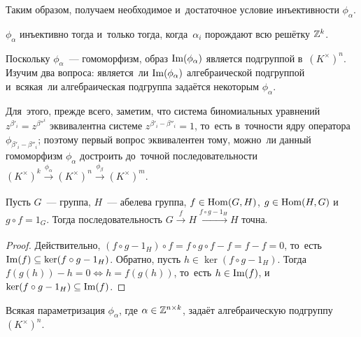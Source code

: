\documentclass{article}
\begin{document}
Таким образом, получаем необходимое и~достаточное условие инъективности $\phi_\alpha$.

\begin{theorem*}
    $\phi_\alpha$ инъективно тогда и~только тогда, когда~$\alpha_i$ порождают всю решётку $\mathbb{Z}^k$.
\end{theorem*}

Поскольку $\phi_\alpha$~— гомоморфизм, образ $\mathrm{Im}(\phi_\alpha)$ является подгруппой в~$(K^\times)^n$.
Изучим два вопроса: является~ли $\mathrm{Im}(\phi_\alpha)$ алгебраической подгруппой и~всякая~ли алгебраическая подгруппа задаётся некоторым $\phi_\alpha$.

Для~этого, прежде всего, заметим, что система биномиальных уравнений $z^{\beta'_i} = z^{\beta''^i}$ эквивалентна
системе $z^{\beta'_i - \beta''_i} = 1$, то~есть в~точности ядру оператора $\phi_{\beta'_i - \beta''_i}$;
поэтому первый вопрос эквивалентен тому, можно~ли данный гомоморфизм $\phi_\alpha$ достроить
до~точной последовательности $(K^\times)^k \xrightarrow[]{\phi_\alpha} (K^\times)^n \xrightarrow[]{\phi_\beta} (K^\times)^m$.

\begin{lemma*}
    Пусть $G$~— группа, $H$~— абелева группа, $f \in \mathrm{Hom}(G, H)$, $g \in \mathrm{Hom}(H, G)$ и~$g \circ f = 1_G$.
    Тогда последовательность $G \xrightarrow[]{f} H \xrightarrow[]{f \circ g - 1_H} H$ точна.
\end{lemma*}

\begin{proof}
    Действительно, $(f \circ g - 1_H) \circ f = f \circ g \circ f - f = f - f = 0$, то~есть $\mathrm{Im}(f) \subseteq \ker(f \circ g - 1_H)$. 
    Обратно, пусть $h \in \ker(f \circ g - 1_H)$. Тогда $f(g(h)) - h = 0 \Leftrightarrow h = f(g(h))$, то~есть $h \in \mathrm{Im}(f)$,
    и~$\ker(f \circ g - 1_H) \subseteq \mathrm{Im}(f)$.
\end{proof}

\begin{theorem*}
    Всякая параметризация $\phi_\alpha$, где $\alpha \in \mathbb{Z}^{n \times k}$, задаёт алгебраическую подгруппу $(K^\times)^n$.
\end{theorem*}
\end{document}
